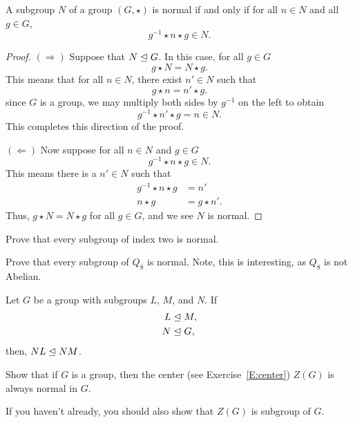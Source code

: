 \documentclass{ximera}
\begin{document}
\begin{lemma}\label{L:nsc}
  A subgroup $N$ of a group $(G,\star)$ is normal if and only if for
  all $n\in N$ and all $g\in G$,
  \[
  g^{-1}\star n\star g\in N.
  \]
  \begin{proof}
    $(\Rightarrow)$ Suppose that $N\trianglelefteq G$. In this case, for all
    $g\in G$
    \[
    g\star N = N\star g.
    \]
    This means that for all $n\in N$, there exist $n'\in N$ such
    that
    \[
    g\star n = n'\star g.
    \]
    since $G$ is a group, we may multiply both sides by $g^{-1}$ on
    the left to obtain
    \[
    g^{-1} \star n' \star g = n\in N.
    \]
    This completes this direction of the proof.

    $(\Leftarrow)$ Now suppose for all $n\in N$ and $g\in G$ 
    \[
    g^{-1}\star n\star g \in N.
    \]
    This means there is a $n'\in N$ such that
    \begin{align*}
      g^{-1}\star n\star g  &= n'\\
      n \star g &= g\star n'.
    \end{align*}
    Thus, $g\star N =N\star g$ for all $g\in G$, and we see $N$ is
    normal.
  \end{proof}
\end{lemma}

\begin{exercise}
  Prove that every subgroup of index two is normal.
\end{exercise}

\begin{exercise}
  Prove that every subgroup of $Q_8$ is normal. Note, this is
  interesting, as $Q_8$ is not Abelian.
\end{exercise}



\begin{exercise}
  Let $G$ be a group with subgroups $L$, $M$, and $N$. If
  \begin{align*}
    L &\trianglelefteq M,\\
    N &\trianglelefteq G,
  \end{align*}
  then, $NL\trianglelefteq NM$.
\end{exercise}

\begin{exercise}
  Show that if $G$ is a group, then the center (see
  Exercise~\ref{E:center}) $Z(G)$ is always normal in $G$.

  If you haven't already, you should also show that $Z(G)$ is subgroup
  of $G$.
\end{exercise}
\end{document}
